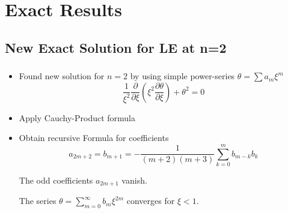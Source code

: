 \section{Exact Results}


\subsection{New Exact Solution for LE at n=2}
\begin{frame}
	\frametitle{\insertsubsection}
	\begin{itemize}[<+->]
		\item Found new solution for $n=2$ by using simple power-series $\theta=\sum a_m\xi^m$
		\begin{equation}
			\frac{1}{\xi^2}\frac{\partial}{\partial\xi}\left(\xi^2\frac{\partial\theta}{\partial\xi}\right) +\theta^2 =0
		\end{equation}
		\item Apply Cauchy-Product formula
		\item Obtain recursive Formula for coefficients
		\begin{equation}
			a_{2m+2}=b_{m+1}= -\frac{1}{(m+2)(m+3)}\sum\limits_{k=0}^mb_{m-k}b_k
		\end{equation}
		\begin{theorem}
			The odd coefficients $a_{2m+1}$ vanish.
		\end{theorem}
		\begin{theorem}
			The series $\theta=\sum\limits_{m=0}^\infty b_{m}\xi^{2m}$ converges for $\xi<1$. %
		\end{theorem}
	\end{itemize}
\end{frame}


